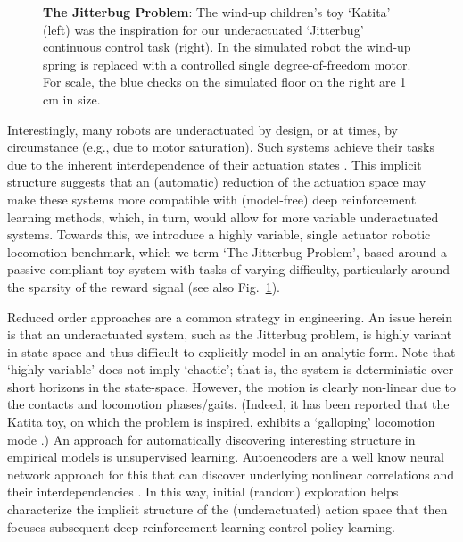\documentclass[letterpaper, 10 pt, conference]{ieeeconf}
\begin{document}
\begin{figure}[t]
    \setlength{\belowcaptionskip}{-10pt}
    \caption{
        \textbf{The Jitterbug Problem}: The wind-up children's toy `Katita' (left) was the inspiration for our underactuated `Jitterbug' continuous control task (right).
        In the simulated robot the wind-up spring is replaced with a controlled single degree-of-freedom motor.
        For scale, the blue checks on the simulated floor on the right are 1 cm in size.
        }
        \vspace*{-6pt}
    \label{fig:leader}
    
\end{figure} 

Interestingly, many robots are underactuated by design, or at times, by circumstance (e.g., due to motor saturation).
Such systems achieve their tasks due to the inherent interdependence of their actuation states \cite{spong1998underactuated}.
This implicit structure suggests that an (automatic) reduction of the actuation space may make these systems more compatible with (model-free) deep reinforcement learning methods, which, in turn, would allow for more variable underactuated systems.
Towards this, we introduce a highly variable, single actuator robotic locomotion benchmark, which we term `The Jitterbug Problem', based around a passive compliant toy system with tasks of varying difficulty, particularly around the sparsity of the reward signal (see also Fig.~\ref{fig:leader}).

Reduced order approaches are a common strategy in engineering.
An issue herein is that an underactuated system, such as the Jitterbug problem, is highly variant in state space and thus difficult to explicitly model in an analytic form.
Note that `highly variable' does not imply `chaotic'; that is, the system is deterministic over short horizons in the state-space.
However, the motion is clearly non-linear due to the contacts and locomotion phases/gaits.  (Indeed, it has been reported that the Katita toy, on which the problem is inspired, exhibits a `galloping' locomotion mode \cite{jgn.thesis}.)
An approach for automatically discovering interesting structure in empirical models is unsupervised learning.
Autoencoders are a well know neural network approach for this that can discover underlying nonlinear correlations and their interdependencies \cite{AE_hinton2006reducing}.
In this way, initial (random) exploration helps characterize the implicit structure of the (underactuated) action space that then focuses subsequent deep reinforcement learning control policy learning.
\end{document}
